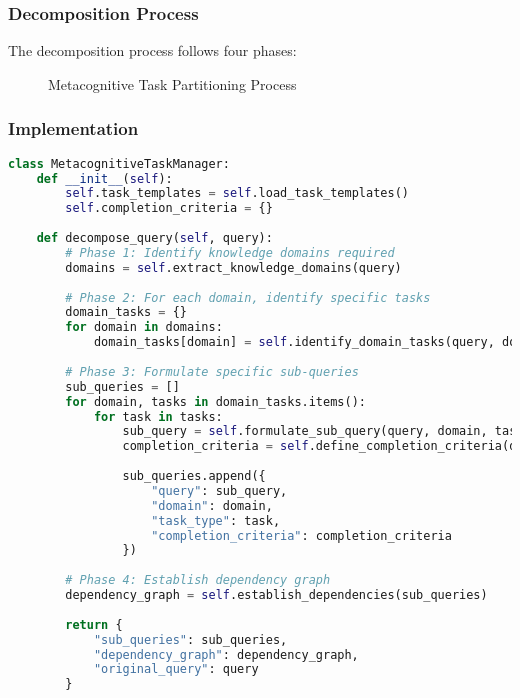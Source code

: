 \documentclass[journal,onecolumn]{IEEEtran}
\begin{document}
\subsubsection{Decomposition Process}

The decomposition process follows four phases:

\begin{figure}[ht]
\centering
{}
\caption{Metacognitive Task Partitioning Process}
\label{fig:mtp-process}
\end{figure}

\subsubsection{Implementation}

\begin{lstlisting}[language=Python, caption=MTP Implementation Pseudocode]
class MetacognitiveTaskManager:
    def __init__(self):
        self.task_templates = self.load_task_templates()
        self.completion_criteria = {}
        
    def decompose_query(self, query):
        # Phase 1: Identify knowledge domains required
        domains = self.extract_knowledge_domains(query)
        
        # Phase 2: For each domain, identify specific tasks
        domain_tasks = {}
        for domain in domains:
            domain_tasks[domain] = self.identify_domain_tasks(query, domain)
        
        # Phase 3: Formulate specific sub-queries
        sub_queries = []
        for domain, tasks in domain_tasks.items():
            for task in tasks:
                sub_query = self.formulate_sub_query(query, domain, task)
                completion_criteria = self.define_completion_criteria(domain, task)
                
                sub_queries.append({
                    "query": sub_query,
                    "domain": domain,
                    "task_type": task,
                    "completion_criteria": completion_criteria
                })
        
        # Phase 4: Establish dependency graph
        dependency_graph = self.establish_dependencies(sub_queries)
        
        return {
            "sub_queries": sub_queries,
            "dependency_graph": dependency_graph,
            "original_query": query
        }
\end{lstlisting}
\end{document}
